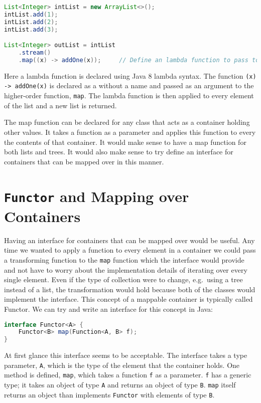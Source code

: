 \begin{lstlisting}[nolol, language=Java, label={lst:map}]
List<Integer> intList = new ArrayList<>();
intList.add(1);
intList.add(2);
intList.add(3);

List<Integer> outList = intList
    .stream()
    .map((x) -> addOne(x));     // Define an lambda function to pass to map
\end{lstlisting}

Here a lambda function is declared using Java 8 lambda syntax. The function
\lstinline{(x) -> addOne(x)} is declared as a without a name and passed as an
argument to the higher-order function, \lstinline{map}. The lambda function is
then applied to every element of the list and a new list is returned. 

The map function can be declared for any class that acts as a container holding
other values. It takes a function as a parameter and applies this function to
every the contents of that container. It would make sense to have a map
function for both lists and trees. It would also make sense to try define an
interface for containers that can be mapped over in this manner.

\section{\texttt{Functor} and Mapping over Containers}
Having an interface for containers that can be mapped over would be useful.
Any time we wanted to apply a function to every element in a container we could
pass a transforming function to the \lstinline{map} function which the
interface would provide and not have to worry about the implementation details
of iterating over every single element. Even if the type of collection were to
change, e.g.\ using a tree instead of a list, the transformation would hold
because both of the classes would implement the interface. This concept of a
mappable container is typically called Functor. We can try and write an
interface for this concept in Java:

\begin{lstlisting}[caption=An attempt to define Functor in Java., language=Java, label={lst:javaFunctor}]
interface Functor<A> {
    Functor<B> map(Function<A, B> f);
}
\end{lstlisting}

At first glance this interface seems to be acceptable. The interface takes a
type parameter, \lstinline{A}, which is the type of the element that the
container holds. One method is defined, \lstinline{map}, which takes a function \lstinline{f}
as a parameter. \lstinline{f} has a generic type; it takes an object
of type \lstinline{A} and returns an object of type \lstinline{B}. \lstinline{map}
itself returns an object than implements \lstinline{Functor} with elements of
type \lstinline{B}. 

